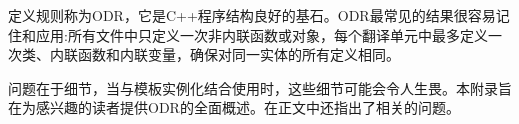 定义规则称为ODR，它是C++程序结构良好的基石。ODR最常见的结果很容易记住和应用:所有文件中只定义一次非内联函数或对象，每个翻译单元中最多定义一次类、内联函数和内联变量，确保对同一实体的所有定义相同。

问题在于细节，当与模板实例化结合使用时，这些细节可能会令人生畏。本附录旨在为感兴趣的读者提供ODR的全面概述。在正文中还指出了相关的问题。

















































